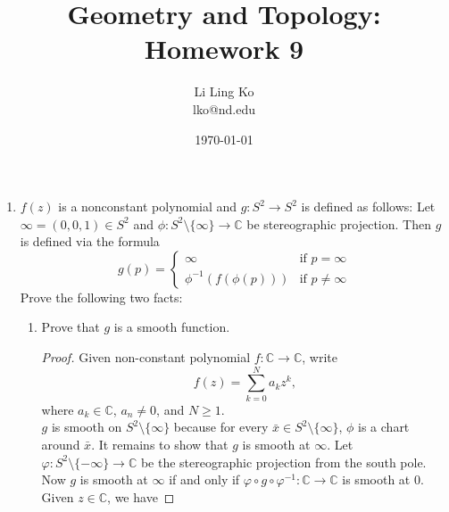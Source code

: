 \documentclass{article}
\begin{document}
\title{Geometry and Topology: Homework 9}
\author{Li Ling Ko\\ lko@nd.edu}
\date{\today}
\maketitle

\begin{enumerate}[label={\bf Q\arabic*:}]
  \item $f(z)$ is a nonconstant polynomial and $g:S^2\to S^2$ is defined as
    follows: Let $\infty=(0,0,1)\in S^2$ and
    $\phi:S^2\setminus\{\infty\}\to\mathbb{C}$ be stereographic projection.
    Then $g$ is defined via the formula
    \[g(p)=\begin{cases} \infty &\mbox{if }p=\infty\\ \phi^{-1}(f(\phi(p)))
      &\mbox{if }p\not=\infty\end{cases}\]
    Prove the following two facts:

    \begin{enumerate}
      \item Prove that $g$ is a smooth function.
        \begin{proof}
          Given non-constant polynomial
          $f:\mathbb{C}\rightarrow\mathbb{C}$, write
          \[f(z)=\sum_{k=0}^Na_kz^k,\] where $a_k\in\mathbb{C}$,
          $a_n\neq0$, and $N\geq1$. \\

          $g$ is smooth on $S^2\setminus\{\infty\}$ because for every
          $\bar{x}\in S^2\setminus\{\infty\}$, $\phi$ is a chart around
          $\bar{x}$. It remains to show that $g$ is smooth at $\infty$.
          Let $\varphi:S^2\setminus\{-\infty\}\rightarrow\mathbb{C}$ be
          the stereographic projection from the south pole.
          Now $g$ is smooth at $\infty$ if and only if $\varphi\circ
          g\circ\varphi^{-1}:\mathbb{C}\rightarrow\mathbb{C}$ is smooth at
          0. Given $z\in\mathbb{C}$, we have


\end{proof}
\end{enumerate}
\end{enumerate}
\end{document}

